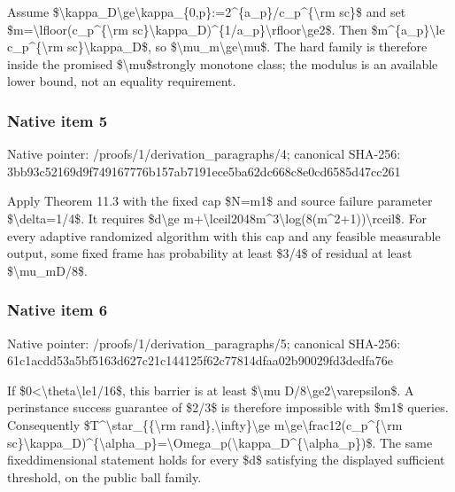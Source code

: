 \documentclass[10pt,a4paper]{article}
\begin{document}
Assume \$\textbackslash{}kappa\_D\textbackslash{}ge\textbackslash{}kappa\_\{0,p\}\allowbreak{}:=2\textasciicircum{}\{a\_p\}/c\_p\textasciicircum{}\{\textbackslash{}rm sc\}\$ and set \$m=\textbackslash{}lfloor(c\_p\textasciicircum{}\{\textbackslash{}rm sc\}\textbackslash{}kappa\_D)\textasciicircum{}\{1/a\_p\}\textbackslash{}rfloor\textbackslash{}ge2\$. Then \$m\textasciicircum{}\{a\_p\}\textbackslash{}le c\_p\textasciicircum{}\{\textbackslash{}rm sc\}\textbackslash{}kappa\_D\$, so \$\textbackslash{}mu\_m\textbackslash{}ge\textbackslash{}mu\$. The hard family is therefore inside the promised \$\textbackslash{}mu\$strongly monotone class; the modulus is an available lower bound, not an equality requirement.


\subsubsection{Native item 5}


Native pointer: /proofs/1/derivation\_paragraphs/4; canonical SHA-256: 3bb93c52169d9f749167776b\allowbreak{}157ab7191ece5ba62dc668c8\allowbreak{}e0cd6585d47cc261


Apply Theorem 11.3 with the fixed cap \$N=m1\$ and source failure parameter \$\textbackslash{}delta=1/4\$. It requires \$d\textbackslash{}ge m+\textbackslash{}lceil2048m\textasciicircum{}3\textbackslash{}log(8(m\textasciicircum{}2+1))\textbackslash{}rceil\$. For every adaptive randomized algorithm with this cap and any feasible measurable output, some fixed frame has probability at least \$3/4\$ of residual at least \$\textbackslash{}mu\_mD/8\$.


\subsubsection{Native item 6}


Native pointer: /proofs/1/derivation\_paragraphs/5; canonical SHA-256: 61c1acdd53a5bf5163d627c2\allowbreak{}1c144125f62c77814dfaa02b\allowbreak{}90029fd3dedfa76e


If \$0<\textbackslash{}theta\textbackslash{}le1/16\$, this barrier is at least \$\textbackslash{}mu D/8\textbackslash{}ge2\textbackslash{}varepsilon\$. A perinstance success guarantee of \$2/3\$ is therefore impossible with \$m1\$ queries. Consequently \$T\textasciicircum{}\textbackslash{}star\_\{\{\textbackslash{}rm rand\},\textbackslash{}infty\}\textbackslash{}ge m\textbackslash{}ge\textbackslash{}frac12(c\_p\textasciicircum{}\{\textbackslash{}rm sc\}\textbackslash{}kappa\_D)\textasciicircum{}\{\textbackslash{}alpha\_p\}=\allowbreak{}\textbackslash{}Omega\_p(\textbackslash{}kappa\_D\textasciicircum{}\{\textbackslash{}alph\allowbreak{}a\_p\})\$. The same fixeddimensional statement holds for every \$d\$ satisfying the displayed sufficient threshold, on the public ball family.
\end{document}
